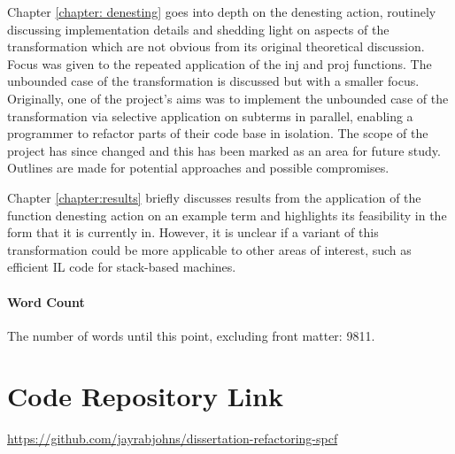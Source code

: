 \documentclass[12pt,a4paper]{report}
\theoremstyle{definition}
\theoremstyle{definition}
\theoremstyle{remark}
\begin{document}
Chapter \ref{chapter: denesting} goes into depth on the denesting action, routinely discussing implementation details and shedding light on aspects of the transformation which are not obvious from its original theoretical discussion. Focus was given to the repeated application of the inj and proj functions. The unbounded case of the transformation is discussed but with a smaller focus. Originally, one of the project's aims was to implement the unbounded case of the transformation via selective application on subterms in parallel, enabling a programmer to refactor parts of their code base in isolation. The scope of the project has since changed and this has been marked as an area for future study. Outlines are made for potential approaches and possible compromises. 

Chapter \ref{chapter:results} briefly discusses results from the application of the function denesting action on an example term and highlights its feasibility in the form that it is currently in. However, it is unclear if a variant of this transformation could be more applicable to other areas of interest, such as efficient IL code for stack-based machines.

\vfill
\subsubsection{Word Count}
The number of words until this point, excluding front matter: 9811.



\appendix

\chapter{Code Repository Link}
\url{https://github.com/jayrabjohns/dissertation-refactoring-spcf}



\end{document}
